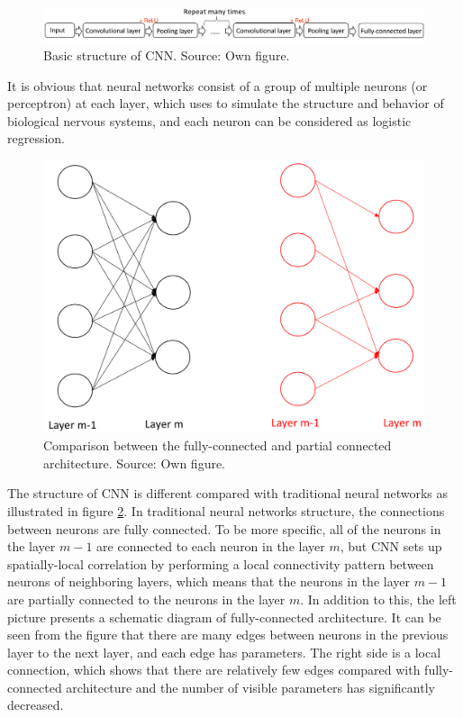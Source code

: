 \documentclass[]{krantz}
\begin{document}
\begin{figure}[h]

{\centering \includegraphics[width=1.05\linewidth]{figures/01-00-deep-learning-for-nlp/01_03_basic_structure} 

}

\caption{Basic structure of CNN. Source: Own figure.}\label{fig:figintro1}
\end{figure}

It is obvious that neural networks consist of a group of multiple neurons (or perceptron) at each layer, which uses to simulate the structure and behavior of biological nervous systems, and each neuron can be considered as logistic regression.

\begin{figure}[h]

{\centering \includegraphics[width=0.5\linewidth]{figures/01-00-deep-learning-for-nlp/01_03_Comparison_Fully_Partial} 

}

\caption{Comparison between the fully-connected and partial connected architecture. Source: Own figure.}\label{fig:figintro2}
\end{figure}

The structure of CNN is different compared with traditional neural networks as illustrated in figure \ref{fig:figintro2}. In traditional neural networks structure, the connections between neurons are fully connected. To be more specific, all of the neurons in the layer \(m-1\) are connected to each neuron in the layer \(m\), but CNN sets up spatially-local correlation by performing a local connectivity pattern between neurons of neighboring layers, which means that the neurons in the layer \(m-1\) are partially connected to the neurons in the layer \(m\). In addition to this, the left picture presents a schematic diagram of fully-connected architecture. It can be seen from the figure that there are many edges between neurons in the previous layer to the next layer, and each edge has parameters. The right side is a local connection, which shows that there are relatively few edges compared with fully-connected architecture and the number of visible parameters has significantly decreased.
\end{document}

